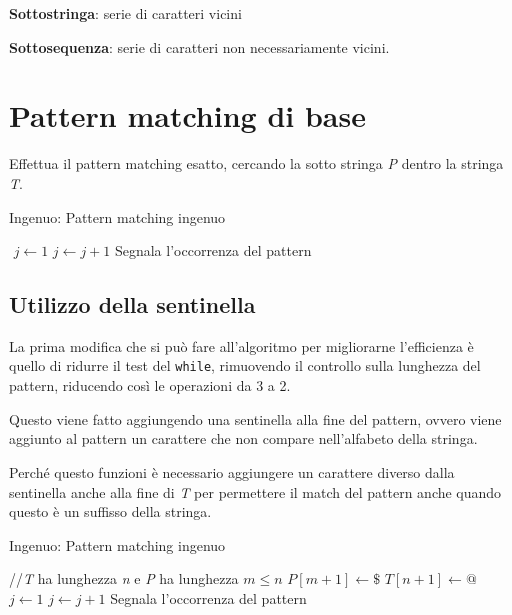 \textbf{Sottostringa}: serie di caratteri vicini

\textbf{Sottosequenza}: serie di caratteri non necessariamente vicini.

\section{Pattern matching di base}\label{pattern-matching-di-base}

Effettua il pattern matching esatto, cercando la sotto stringa \emph{P}
dentro la stringa \emph{T}.

\begin{breakablealgorithm}
	\caption{Ingenuo: Pattern matching ingenuo}
	\begin{algorithmic}[1]
	\State $  $ 
		\State $ j \gets 1 $
	        \State $ j \gets j + 1 $
	    \EndWhile
	        \State Segnala l'occorrenza del pattern
	    \EndIf
	\EndFor
	\EndFunction
\end{algorithmic}
\end{breakablealgorithm}

\subsection{Utilizzo della sentinella}\label{utilizzo-della-sentinella}

La prima modifica che si può fare all'algoritmo per migliorarne
l'efficienza è quello di ridurre il test del \texttt{while}, rimuovendo
il controllo sulla lunghezza del pattern, riducendo così le operazioni
da 3 a 2.

Questo viene fatto aggiungendo una sentinella alla fine del pattern,
ovvero viene aggiunto al pattern un carattere che non compare
nell'alfabeto della stringa.

Perché questo funzioni è necessario aggiungere un carattere diverso
dalla sentinella anche alla fine di \emph{T} per permettere il match del
pattern anche quando questo è un suffisso della stringa.

\begin{breakablealgorithm}
	\caption{Ingenuo: Pattern matching ingenuo}
	\begin{algorithmic}[1]
        \State //\textit{T} ha lunghezza \textit{n} e \textit{P} ha lunghezza $ m \leq n $
        \State $ P[m+1] \gets \$ $
        \State $ T[n+1] \gets @$
	        \State $ j \gets 1 $
		        \State $ j \gets j + 1 $
	        \EndWhile
		        \State Segnala l'occorrenza del pattern
	        \EndIf
        \EndFor
        \EndFunction
\end{algorithmic}
\end{breakablealgorithm}

